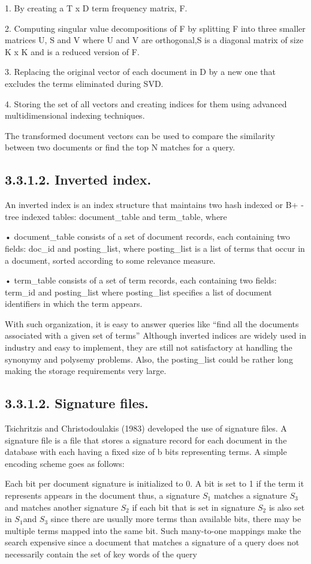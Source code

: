 \documentclass{article}
\begin{document}
1.	By creating a T x D term frequency matrix, F.

2.	Computing  singular value decompositions of F by splitting F into three smaller matrices U, S and V where U and V are orthogonal,S is a diagonal matrix of size K x K and is a reduced version of F.

3.	 Replacing the original vector of each document in D by a new one that excludes the terms eliminated during SVD. 

4.	Storing the set of all vectors and creating indices for them using advanced multidimensional indexing techniques.

The transformed document vectors can be used to compare the similarity between two documents or find the top N matches for a query. 
\subsection*{3.3.1.2. Inverted index.}
An inverted index is an index structure that maintains two hash indexed  or B+ - tree indexed tables: document\_table and term\_table, where
 
•	document\_table consists of a set of document records, each containing two fields: doc\_id and posting\_list, where posting\_list is a list of terms that occur in a document, sorted according to some relevance measure.

•	term\_table consists of a set of term records, each containing two fields: term\_id and posting\_list where posting\_list specifies a list of document identifiers in which the term appears.

With such organization, it is easy to answer queries like “find all the documents associated with a given set of terms” Although inverted indices are widely used in industry and easy to implement, they are still not satisfactory at handling the synonymy and polysemy problems. Also, the posting\_list  could be rather long making the storage requirements very large.

\subsection*{3.3.1.2. Signature files.}
Tsichritzis and Christodoulakis (1983) developed the use of signature files.
 A signature file is a file that stores a signature record for each document in the database with each having a fixed size of b bits representing terms. A simple encoding scheme goes as follows:
 
Each bit per document signature is initialized to 0. A bit is set to 1 if the term it represents appears in the document thus, a signature $S_{1}$ matches a signature $S_{3}$ and matches another signature $S_{2}$ if each bit that is set in signature $S_{2}$ is also set in $S_{1}$and $S_{3}$ since there are usually more terms than available bits, there may be multiple terms mapped into the same bit. Such many-to-one mappings make the search expensive since a document that matches a signature of a query does not necessarily contain the set of key words of the query 
\end{document}
